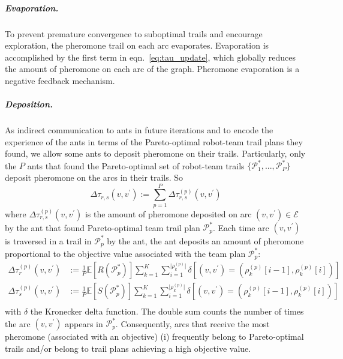 \documentclass[11pt, oneside]{article}
\begin{document}
\subparagraph{Evaporation.} To prevent premature convergence to suboptimal trails and encourage exploration, the pheromone trail on each arc evaporates. 
Evaporation is accomplished by the first term in eqn.~\ref{eq:tau_update}, which globally reduces the amount of pheromone on each arc of the graph. 
Pheromone evaporation is a negative feedback mechanism. 

\subparagraph{Deposition.}
As indirect communication to ants in future iterations and to encode the experience of the ants in terms of the Pareto-optimal robot-team trail plans they found, we allow some ants to deposit pheromone on their trails.
Particularly, only the $P$ ants that found the Pareto-optimal set of robot-team trails $\{\mathcal{P}_1^*, ..., \mathcal{P}_P^*\}$ deposit pheromone on the arcs in their trails. So
\begin{equation}
	\Delta \tau_{r,s}(v, v^\prime):=\sum_{p=1}^P \Delta \tau_{r,s}^{(p)}(v, v^\prime)
\end{equation}
where $\Delta \tau_{r,s}^{(p)}(v, v^\prime)$ is the amount of pheromone deposited 
on arc $(v, v^\prime)\in \mathcal{E}$
by the ant that found Pareto-optimal team trail plan $\mathcal{P}^*_p$.
Each time arc $(v, v^\prime)$ is traversed in a trail in $\mathcal{P}^*_p$ by the ant, 
the ant deposits an amount of pheromone proportional to the objective value associated with the team plan $\mathcal{P}^*_p$:
\begin{align}
	\Delta \tau_r^{(p)}(v, v^\prime)& := 
	\frac{1}{P} \mathbb{E}[R(\mathcal{P}^*_p)] 
	\sum_{k=1}^K 
	\sum_{i=1}^{\lvert \rho_k^{(p)}\rvert}
	\delta \left[ 
		(v, v^\prime)=(\rho_k^{(p)}[i-1], \rho_k^{(p)}[i])
	\right] \\
	\Delta \tau_s^{(p)}(v, v^\prime)& := 
	\frac{1}{P} \mathbb{E}[S(\mathcal{P}^*_p)] 
	\sum_{k=1}^K 
	\sum_{i=1}^{\lvert \rho_k^{(p)}\rvert}
	\delta \left[ 
		(v, v^\prime)=(\rho_k^{(p)}[i-1], \rho_k^{(p)}[i])
	\right] \\
\end{align}
with $\delta$ the Kronecker delta function.
The double sum counts the number of times the arc $(v, v^\prime)$ appears in $\mathcal{P}^*_p$.
Consequently, arcs that receive the most pheromone (associated with an objective) (i) frequently belong to Pareto-optimal trails and/or belong to trail plans achieving a high objective value. 
\end{document}
